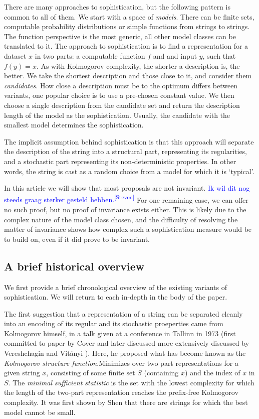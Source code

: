 \documentclass{style/llncs}
\newcommand{\sdr}[1]{\textcolor{blue}{\small #1\textsuperscript{[Steven]} }}
\begin{document}
There are many approaches to sophistication, but the following pattern is common to all of them. We start with a space of \emph{models}. There can be finite sets, computable probability distributions or simple functions from strings to strings. The function perspective is the most generic, all other model classes can be translated to it. The approach to sophistication is to find a representation for a dataset $x$ in two parts: a computable function $f$ and and input $y$, such that $f(y) = x$. As with Kolmogorov complexity, the shorter a description is, the better. We take the shortest description and those close to it, and consider them \emph{candidates}. How close a description must be to the optimum differs between variants, one popular choice is to use a pre-chosen constant value. We then choose a single description from the candidate set and return the description length of the model as the sophistication. Usually, the candidate with the smallest model determines the sophistication.

The implicit assumption behind sophistication is that this approach will separate the description of the string into a structural part, representing its regularities, and a stochastic part representing its non-deterministic properties. In other words, the string is cast as a random choice from a model for which it is `typical'.  

In this article we will show that most proposals are not invariant. \sdr{Ik wil dit nog steeds graag sterker gesteld hebben.} For one remaining case, we can offer no such proof, but no proof of invariance exists either. This is likely due to the complex nature of the model class chosen, and the difficulty of resolving the matter of invariance shows how complex such a sophistication measure would be to build on, even if it did prove to be invariant.

\subsection{A brief historical overview}

We first provide a brief chronological overview of the existing variants of sophistication. We will return to each in-depth in the body of the paper. 

The first suggestion that a representation of a string can be separated cleanly into an encoding of its regular and its stochastic proeperties came from Kolmogorov himself, in a talk given at a conference in Tallinn in 1973 (first committed to paper by Cover \cite{cover1985kolmogorov} and later discussed more extensively discussed by Vereshchagin and Vit\'anyi \cite{vereshchagin2004kolmogorov}). Here, he proposed what has become known as the \emph{Kolmogorov structure function}.Minimizes over two part representations for a given string $x$, consisting of some finite set $S$ (containing $x$) and the index of $x$ in $S$. The \emph{minimal sufficient statistic} is the set with the lowest complexity for which the length of the two-part representation reaches the prefix-free Kolmogorov complexity. It was first shown by Shen \cite{shen1983concept} that there are strings for which the best model cannot be small.
\end{document}
